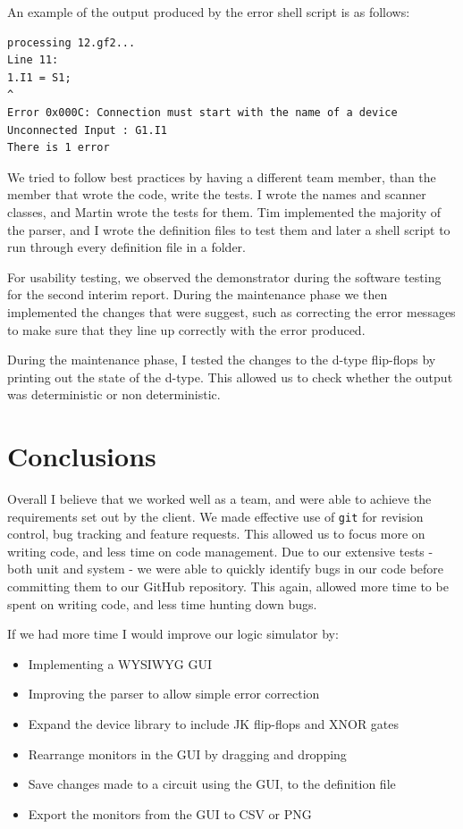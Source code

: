 \documentclass[a4paper,10pt]{article}
\begin{document}
An example of the output produced by the error shell script is as follows:

\begin{verbatim}
processing 12.gf2...
Line 11:
1.I1 = S1;
^
Error 0x000C: Connection must start with the name of a device
Unconnected Input : G1.I1
There is 1 error
\end{verbatim}

We tried to follow best practices by having a different team member, than the member that wrote the code, write the tests. I wrote the names and scanner classes, and Martin wrote the tests for them. Tim implemented the majority of the parser, and I wrote the definition files to test them and later a shell script to run through every definition file in a folder.

For usability testing, we observed the demonstrator during the software testing for the second interim report. During the maintenance phase we then implemented the changes that were suggest, such as correcting the error messages to make sure that they line up correctly with the error produced.

During the maintenance phase, I tested the changes to the d-type flip-flops by printing out the state of the d-type. This allowed us to check whether the output was deterministic or non deterministic.


\section{Conclusions}

Overall I believe that we worked well as a team, and were able to achieve the requirements set out by the client. We made effective use of \texttt{git} for revision control, bug tracking and feature requests. This allowed us to focus more on writing code, and less time on code management. Due to our extensive tests - both unit and system - we were able to quickly identify bugs in our code before committing them to our GitHub repository. This again, allowed more time to be spent on writing code, and less time hunting down bugs. 

If we had more time I would improve our logic simulator by:

\begin{itemize}
\item Implementing a WYSIWYG GUI
\item Improving the parser to allow simple error correction
\item Expand the device library to include JK flip-flops and XNOR gates
\item Rearrange monitors in the GUI by dragging and dropping
\item Save changes made to a circuit using the GUI, to the definition file
\item Export the monitors from the GUI to CSV or PNG
\end{itemize}
\end{document}
